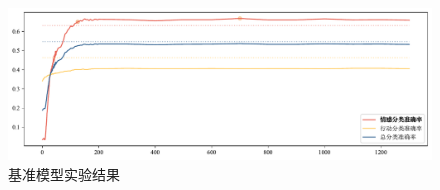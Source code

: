 \begin{figure}[htb]
	\centering
	\includegraphics[width=0.75\linewidth]{images/基准.pdf}
	\caption{基准模型实验结果}
	\label{fig:Base}
\end{figure}